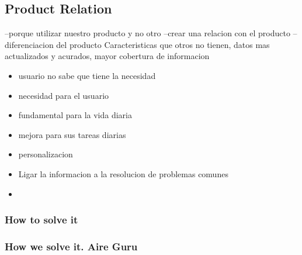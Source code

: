 \subsection{Product Relation}
--porque utilizar nuestro producto y no otro 
--crear una relacion con el producto
--diferenciacion del producto 
Caracteristicas que otros no tienen, datos mas actualizados y acurados, mayor cobertura de informacion

\begin{itemize}

    \item usuario no sabe que tiene la necesidad
    \item necesidad para el usuario
    \item fundamental para la vida diaria
    \item mejora para sus tareas diarias
    \item personalizacion
    \item Ligar la informacion a la resolucion de problemas comunes
    \item \end{itemize}
\subsubsection{How to solve it} 


\subsubsection{How we solve it. Aire Guru} 
 
\begin{itemize}
    \done
    \crossed
    
\end{itemize}
\newpage